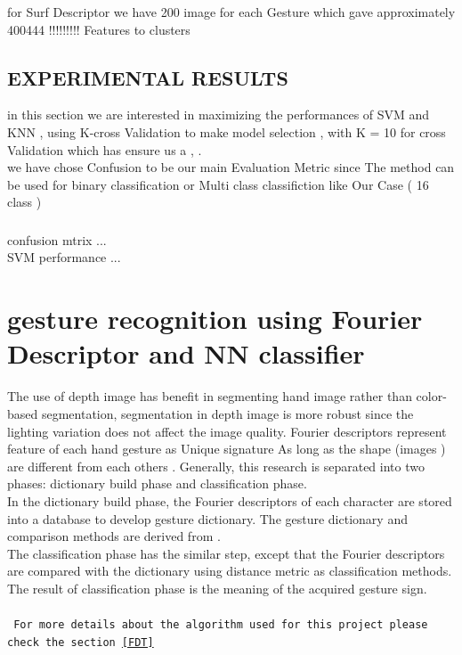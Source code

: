 for Surf Descriptor we have 200 image for each Gesture  which gave approximately 400444 !!!!!!!!! Features to clusters 

\subsection{EXPERIMENTAL RESULTS }\label{resultssvm}
in this section we are interested in maximizing the performances of SVM and KNN , using K-cross Validation to make model selection , with  K = 10 for cross Validation which has ensure us a   ,  . \\
we have chose Confusion to be our main Evaluation Metric since The method can be used for binary classification or Multi class classifiction like Our Case ( 16 class ) 

\subsubsection{ } 

confusion mtrix ...\\
SVM performance ...

\newpage





\section{gesture recognition using Fourier Descriptor and NN  classifier }

 The use of depth image has benefit
in segmenting hand image rather than color-based
segmentation, segmentation in depth image is more robust
since the lighting variation does not affect the image quality.
 Fourier descriptors represent feature of each hand gesture as Unique signature As long as the shape (images ) are different from each others .
Generally, this research is separated into two phases:
dictionary build phase and classification phase. \\In the
dictionary build phase, the Fourier descriptors of each
character are stored into a database to develop gesture
dictionary. The gesture dictionary and comparison methods are
derived from \cite{clif}.\\ The classification phase has the similar
step, except that the Fourier descriptors are compared with the
dictionary using distance metric as classification methods.
The result of classification phase is the meaning of the
acquired gesture sign.\\\\
\texttt{
For more details about the algorithm used for this project please check the section \ref{FDT}
}

